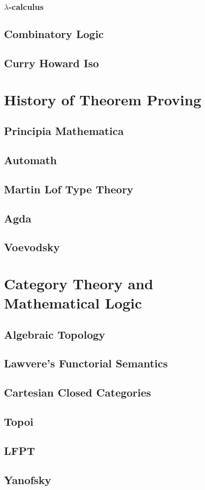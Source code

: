 \subsubsection{$\lambda$-calculus}
\subsection{Combinatory Logic}
\subsection{Curry Howard Iso}

\section{History of Theorem Proving}
\subsection{Principia Mathematica}
\subsection{Automath}
\subsection{Martin Lof Type Theory}
\subsection{Agda}
\subsection{Voevodsky}

\section{Category Theory and Mathematical Logic}
\subsection{Algebraic Topology}
\subsection{Lawvere's Functorial Semantics}
\subsection{Cartesian Closed Categories}
\subsection{Topoi}
\subsection{LFPT}
\subsection{Yanofsky}

